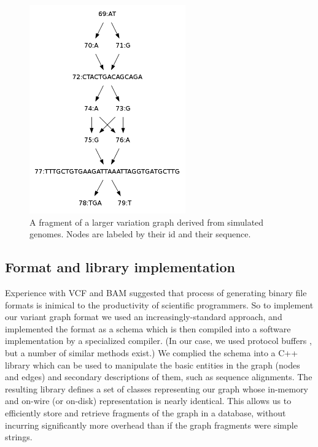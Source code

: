 \documentclass{article}
\begin{document}
\begin{figure}
\centering
\includegraphics[width=0.6\textwidth]{figures/variationgraph}
\caption{\label{fig:variationgraph}
A fragment of a larger variation graph derived from simulated genomes. Nodes are labeled by their id and their sequence.
}
\end{figure}

\subsection{Format and library implementation}

Experience with VCF \cite{danecek2011} and BAM \cite{li2009sambam} suggested that process of generating binary file formats is inimical to the productivity of scientific programmers.
So to implement our variant graph format we used an increasingly-standard approach, and implemented the format as a schema which is then compiled into a software implementation by a specialized compiler. (In our case, we used protocol buffers \cite{protobuf}, but a number of similar methods exist.)
We complied the schema into a C++ library which can be used to manipulate the basic entities in the graph (nodes and edges) and secondary descriptions of them, such as sequence alignments.
The resulting library defines a set of classes representing our graph whose in-memory and on-wire (or on-disk) representation is nearly identical.
This allows us to efficiently store and retrieve fragments of the graph in a database, without incurring significantly more overhead than if the graph fragments were simple strings.
\end{document}
